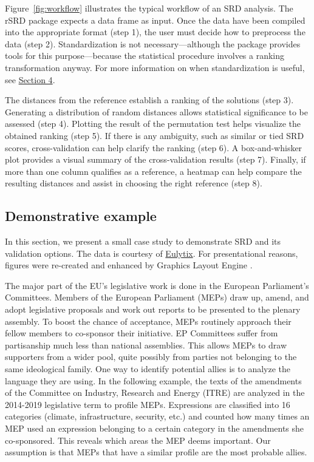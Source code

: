 Figure~\ref{fig:workflow} illustrates the typical workflow of an SRD analysis. The rSRD package expects a data frame as input. Once the data have been compiled into the appropriate format (step 1), the user must decide how to preprocess the data (step 2). Standardization is not necessary---although the package provides tools for this purpose---because the statistical procedure involves a ranking transformation anyway. For more information on when standardization is useful, see \hyperref[sec:preprocessing]{Section 4}.

The distances from the reference establish a ranking of the solutions (step 3). Generating a distribution of random distances allows statistical significance to be assessed (step 4). Plotting the result of the permutation test helps visualize the obtained ranking (step 5). If there is any ambiguity, such as similar or tied SRD scores, cross-validation can help clarify the ranking (step 6). A box-and-whisker plot provides a visual summary of the cross-validation results (step 7). Finally, if more than one column qualifies as a reference, a heatmap can help compare the resulting distances and assist in choosing the right reference (step 8).

\subsection{Demonstrative example}

In this section, we present a small case study to demonstrate SRD and its validation options. The data is courtesy of \href{https://eulytix.eu}{Eulytix}. For presentational reasons, figures were re-created and enhanced by Graphics Layout Engine \citep{GLE_2022}.

The major part of the EU's legislative work is done in the European Parliament's Committees. Members of the European Parliament (MEPs) draw up, amend, and adopt legislative proposals and work out reports to be presented to the plenary assembly. To boost the chance of acceptance, MEPs routinely approach their fellow members to co-sponsor their initiative. EP Committees suffer from partisanship much less than national assemblies. This allows MEPs to draw supporters from a wider pool, quite possibly from parties not belonging to the same ideological family. One way to identify potential allies is to analyze the language they are using. In the following example, the texts of the amendments of the Committee on Industry, Research and Energy (ITRE) are analyzed in the 2014-2019 legislative term to profile MEPs. Expressions are classified into 16 categories (climate, infrastructure, security, etc.) and counted how many times an MEP used an expression belonging to a certain category in the amendments she co-sponsored. This reveals which areas the MEP deems important. Our assumption is that MEPs that have a similar profile are the most probable allies.

